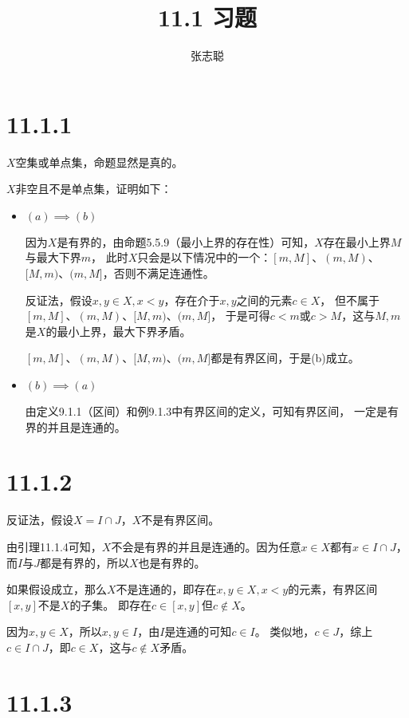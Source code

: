 \documentclass{article}
\begin{document}
\title{11.1 习题}
\author{张志聪}
\maketitle

\section*{11.1.1}

$X$空集或单点集，命题显然是真的。

$X$非空且不是单点集，证明如下：
\begin{itemize}
  \item $(a) \implies (b)$

        因为$X$是有界的，由命题5.5.9（最小上界的存在性）可知，$X$存在最小上界$M$与最大下界$m$，
        此时$X$只会是以下情况中的一个：$[m, M]$、$(m, M)$、$[M, m)$、$(m, M]$，否则不满足连通性。

        反证法，假设$x,y \in X, x < y$，存在介于$x,y$之间的元素$c \in X$，
        但不属于$[m, M]$、$(m, M)$、$[M, m)$、$(m, M]$，
        于是可得$c < m$或$c > M$，这与$M,m$是$X$的最小上界，最大下界矛盾。

        $[m, M]$、$(m, M)$、$[M, m)$、$(m, M]$都是有界区间，于是(b)成立。


  \item $(b) \implies (a)$

        由定义9.1.1（区间）和例9.1.3中有界区间的定义，可知有界区间，
        一定是有界的并且是连通的。

\end{itemize}

\section*{11.1.2}

反证法，假设$X = I \cap J$，$X$不是有界区间。

由引理11.1.4可知，$X$不会是有界的并且是连通的。因为任意$x \in X$都有$x \in I \cap J$，
而$I$与$J$都是有界的，所以$X$也是有界的。

如果假设成立，那么$X$不是连通的，即存在$x, y \in X, x < y$的元素，有界区间$[x, y]$不是$X$的子集。
即存在$c \in [x, y]$但$c \notin X$。

因为$x, y \in X$，所以$x, y \in I$，由$I$是连通的可知$c \in I$。
类似地，$c \in J$，综上$c \in I \cap J$，即$c \in X$，这与$c \notin X$矛盾。

\section*{11.1.3}
\end{document}

